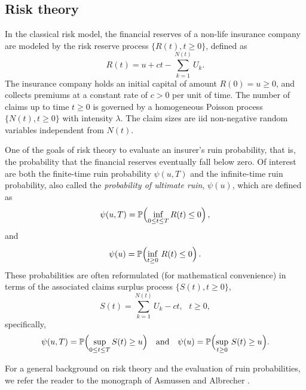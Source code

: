 \subsection{Risk theory}

In the classical risk model, the financial reserves of a non-life insurance company are modeled by the risk reserve process $\{R(t),t\geq0\}$, defined as
\begin{equation*}\label{eq:RiskReserveProcess}
R(t)=u+ct-\sum_{k=1}^{N(t)}U_k.
\end{equation*}
The insurance company holds an initial capital of amount $R(0)=u\geq0$, and collects premiums at a constant rate of $c>0$ per unit of time. The number of claims up to time $t\geq0$ is governed by a homogeneous Poisson process $\{N(t),t\geq0\}$ with intensity $\lambda$. The claim sizes are iid non-negative random variables independent from $N(t)$.

One of the goals of risk theory to evaluate an insurer's ruin probability, that is, the probability that the financial reserves eventually fall below zero. Of interest are both the finite-time ruin probability $\psi(u,T)$ and the infinite-time ruin probability, also called the \emph{probability of ultimate ruin}, $\psi(u)$, which are defined as
\begin{equation*}\label{eq:FiniteTimeRuinProbability}
\psi(u,T)=\operatorname{{\mathbb P}}\Bigl( \inf_{0 \le t \le T} R(t) \leq 0 \Bigr)\,,
\end{equation*}
and
\begin{equation*}\label{eq:InfiniteTimeRuinProbability}
\psi(u)=\operatorname{{\mathbb P}}\Bigl( \inf_{t \geq 0}\,R(t) \leq 0 \Bigr)\,.
\end{equation*}
These probabilities are often reformulated (for mathematical convenience) in terms of the associated claims surplus process $\{S(t),t\geq0\}$,
\begin{equation*} \label{eq:ClaimsSurplusProcess}
S(t) = \sum_{k=1}^{N(t)} U_k - ct,\text{ }t\geq0,
\end{equation*}
specifically,
\begin{equation*}
\psi(u,T)=\operatorname{{\mathbb P}}\Bigl( \sup_{0 \le t \le T} S(t) \geq u \Bigr) \quad \text{and} \quad
\psi(u)=\operatorname{{\mathbb P}}\Bigl( \sup_{t \geq 0}\,S(t) \geq u \Bigr).
\end{equation*}

For a general background on risk theory and the evaluation of ruin probabilities, we refer the reader to the monograph of Asmussen and Albrecher \cite{asmussen2010ruin}.

